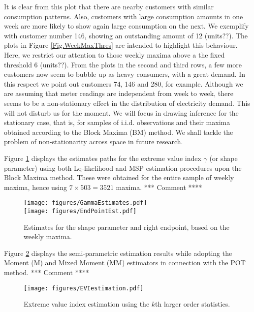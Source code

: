 \documentclass[10pt, a4paper, oneside]{article}
\begin{document}
It is clear from this plot that there are nearby customers with similar consumption patterns. Also, customers with large consumption amounts in one week are more likely to show again large consumption on the next. We exemplify with customer number 146, showing an outstanding amount of 12 (units??). The plots in Figure \ref{Fig.WeekMaxThres} are intended to highlight this behaviour. Here, we restrict our attention to those weekly maxima above a the fixed threshold 6 (units??). From the plots in the second and third rows, a few more customers now seem to bubble up as heavy consumers, with a great demand. In this respect we point out customers 74, 146 and 280, for example. Although we are assuming that meter readings are independent from week to week, there seems to be a non-stationary effect in the distribution of electricity demand. This will not disturb us for the moment. We will focus in drawing inference for the stationary case, that is, for samples of i.i.d. observations and their maxima obtained according to the Block Maxima (BM) method. We shall tackle the problem of non-stationarity across space in future research.

Figure \ref{Fig.BMEst} displays the estimates paths for the extreme value index $\gamma$ (or shape parameter) using both Lq-likelihood and MSP estimation procedures upon the Block Maxima method. These were obtained for the entire sample of weekly maxima, hence using $7\times 503= 3521$ maxima. *** Comment ****

\begin{figure}
\begin{center}
\texttt{[image: figures/GammaEstimates.pdf]}\\
\texttt{[image: figures/EndPointEst.pdf]}
\caption{Estimates for the shape parameter and right endpoint, based on the weekly maxima.} \label{Fig.BMEst}
\end{center}
\end{figure}

Figure \ref{Fig.POTEst} displays the semi-parametric estimation results while adopting the Moment (M) and Mixed Moment (MM) estimators in connection with the POT method. *** Comment ****
\begin{figure}
\begin{center}
\texttt{[image: figures/EVIestimation.pdf]}\\
\caption{Extreme value index estimation using the $k$th larger order statistics.} \label{Fig.POTEst}
\end{center}
\end{figure}







 

\clearpage


\end{document}
